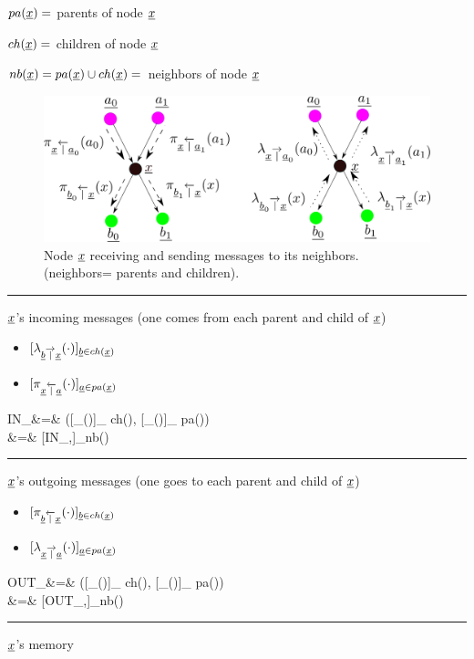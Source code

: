 $pa({\underline{x}})=$ parents of node ${\underline{x}}$

$ch({\underline{x}})=$ children of node ${\underline{x}}$

$nb({\underline{x}})=pa({\underline{x}})\cup ch({\underline{x}})=$ 
neighbors of node ${\underline{x}}$



\begin{figure}[h!]
\centering
\includegraphics[width=6in]{mpass/pi-lam.png}
\caption{Node ${\underline{x}}$ receiving
and sending messages to
 its neighbors. (neighbors=
parents and children).
} 
\label{fig-pi-lam}
\end{figure}




\hrule\noindent
${\underline{x}}$'s incoming messages (one
comes from
each parent and child of ${\underline{x}}$)

\begin{itemize}
\item 
$[\lambda_{{\underline{b}}\overrightarrow{|}{\underline{x}}}(\cdot)]_
{{\underline{b}}\in ch({\underline{x}})}$
\item
$[\pi_{{\underline{x}}\overleftarrow{|}{\underline{a}}}(\cdot)]_
{{\underline{a}}\in  pa({\underline{x}})}$
\end{itemize}

\beqa
IN_\rvx&=&
([\lam_{\rvb\rcond\rvx}(\cdot)]_
{\rvb\in ch(\rvx)},
[\pi_{\rvx\lcond\rva}(\cdot)]_
{\rva\in  pa(\rvx)})
\\
&=&
[IN_{\rvx,\rvn}]_{\rvn\in nb(\rvx)}
\eeqa

\hrule\noindent
${\underline{x}}$'s outgoing messages
 (one goes to each parent 
and child of ${\underline{x}}$)

\begin{itemize}
\item
$[\pi_{{\underline{b}}\overleftarrow{|}{\underline{x}}}(\cdot)]_
{{\underline{b}}\in ch({\underline{x}})}$
\item 
$[\lambda_{{\underline{x}}\overrightarrow{|}{\underline{a}}}(\cdot)]_
{{\underline{a}}\in  pa({\underline{x}})}$
\end{itemize}

\beqa
OUT_\rvx&=&
([\pi_{\rvb\lcond\rvx}(\cdot)]_
{\rvb\in ch(\rvx)},
[\lam_{\rvx\rcond\rva}(\cdot)]_
{\rva\in  pa(\rvx)})
\\
&=&
[OUT_{\rvx,\rvn}]_{\rvn\in nb(\rvx)}
\eeqa
\hrule\noindent
${\underline{x}}$'s memory

